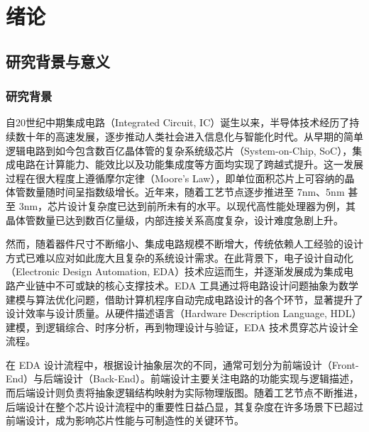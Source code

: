 
\chapter{绪论}
\label{cha:introduction}
\section{研究背景与意义}
\label{sec:background}
\subsection{研究背景}

自20世纪中期集成电路（Integrated Circuit, IC）诞生以来，半导体技术经历了持续数十年的高速发展，逐步推动人类社会进入信息化与智能化时代。从早期的简单逻辑电路到如今包含数百亿晶体管的复杂系统级芯片（System-on-Chip, SoC），集成电路在计算能力、能效比以及功能集成度等方面均实现了跨越式提升。这一发展过程在很大程度上遵循摩尔定律（Moore's Law），即单位面积芯片上可容纳的晶体管数量随时间呈指数级增长。近年来，随着工艺节点逐步推进至 7nm、5nm 甚至 3nm，芯片设计复杂度已达到前所未有的水平。以现代高性能处理器为例，其晶体管数量已达到数百亿量级，内部连接关系高度复杂，设计难度急剧上升。

然而，随着器件尺寸不断缩小、集成电路规模不断增大，传统依赖人工经验的设计方式已难以应对如此庞大且复杂的系统设计需求。在此背景下，电子设计自动化（Electronic Design Automation, EDA）技术应运而生，并逐渐发展成为集成电路产业链中不可或缺的核心支撑技术。EDA 工具通过将电路设计问题抽象为数学建模与算法优化问题，借助计算机程序自动完成电路设计的各个环节，显著提升了设计效率与设计质量。从硬件描述语言（Hardware Description Language, HDL）建模，到逻辑综合、时序分析，再到物理设计与验证，EDA 技术贯穿芯片设计全流程。

在 EDA 设计流程中，根据设计抽象层次的不同，通常可划分为前端设计（Front-End）与后端设计（Back-End）。前端设计主要关注电路的功能实现与逻辑描述，而后端设计则负责将抽象逻辑结构映射为实际物理版图。随着工艺节点不断推进，后端设计在整个芯片设计流程中的重要性日益凸显，其复杂度在许多场景下已超过前端设计，成为影响芯片性能与可制造性的关键环节。

